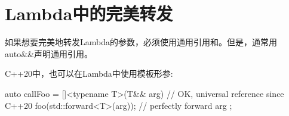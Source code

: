\section{Lambda中的完美转发}
如果想要完美地转发Lambda的参数，必须使用通用引用和。但是，通常用auto\&\&声明通用引用。

C++20中，也可以在Lambda中使用模板形参:

\begin{cppcode}
auto callFoo = []<typename T>(T&& arg) { // OK, universal reference since C++20
	foo(std::forward<T>(arg)); // perfectly forward arg
};
\end{cppcode}

